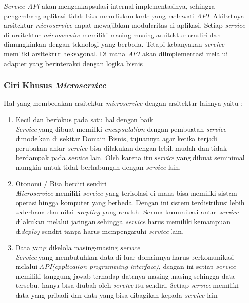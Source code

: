 \textit{Service API} akan mengenkapsulasi internal implementasinya, sehingga pengembang aplikasi tidak bisa menuliskan kode yang melewati \textit{API}. Akibatnya arsitektur \textit{microservice} dapat mewajibkan modularitas di aplikasi.  Setiap \textit{service} di arsitektur \textit{microservice} memiliki masing-masing arsitektur sendiri dan dimungkinkan dengan teknologi yang berbeda. Tetapi kebanyakan \textit{service} memiliki arsitektur heksagonal. Di mana \textit{API} akan diimplementasi melalui adapter yang berinteraksi dengan logika bisnis \cite{1C7}

\subsubsection{Ciri Khusus \textit{Microservice}}
Hal yang membedakan arsitektur \textit{microservice} dengan arsitektur lainnya yaitu \cite{ECD,74C,1C7}:	
\begin{enumerate}[leftmargin=1.3cm]
	\item Kecil dan berfokus pada satu hal dengan baik\\
	\textit{Service} yang dibuat memiliki \textit{encapsulation} dengan pembuatan \textit{service} dimodelkan di sekitar Domain Bisnis, tujuannya agar ketika terjadi perubahan antar \textit{service} bisa dilakukan dengan lebih mudah dan tidak berdampak pada \textit{service} lain. Oleh karena itu \textit{service} yang dibuat seminimal mungkin untuk tidak berhubungan dengan \textit{service} lain. 
	\item Otonomi / Bisa berdiri sendiri\\
	\textit{Microservice} memiliki \textit{service} yang terisolasi di mana bisa memiliki sistem operasi hingga komputer yang berbeda. Dengan ini sistem terdistribusi lebih sederhana dan nilai \textit{coupling} yang rendah. Semua komunikasi antar \textit{service} dilakukan melalui jaringan sehingga \textit{service} harus memiliki kemampuan di\textit{deploy} sendiri tanpa harus mempengaruhi \textit{service} lain.
	\item Data yang dikelola masing-masing \textit{service}\\
	\textit{Service} yang membutuhkan data di luar domainnya harus berkomunikasi melalui \textit{API(application programming interface)}, dengan ini setiap \textit{service} memiliki tanggung jawab terhadap datanya masing-masing sehingga data tersebut hanya bisa diubah oleh \textit{service} itu sendiri. Setiap \textit{service} memiliki data yang pribadi dan data yang bisa dibagikan kepada \textit{service} lain
\end{enumerate}	

